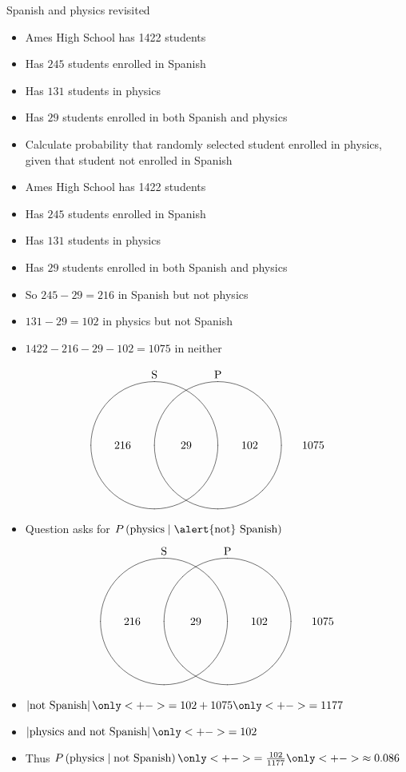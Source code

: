 \documentclass{beamer}
\theoremstyle{definition}
\begin{document}
\begin{frame}{Spanish and physics revisited}
\begin{itemize}
\item Ames High School has 1422 students
\item Has $245$ students enrolled in Spanish
\item Has $131$ students in physics
\item Has $29$ students enrolled in both Spanish and physics
\item Calculate probability that randomly selected student
enrolled in physics, given that student \alert{not} enrolled in Spanish
\end{itemize}
\end{frame}

\begin{frame}
\begin{itemize}
\item Ames High School has 1422 students
\item Has $245$ students enrolled in Spanish
\item Has $131$ students in physics
\item Has $29$ students enrolled in both Spanish and physics
\item So $245-29=216$ in Spanish but not physics
\item $131-29=102$ in physics but not Spanish
\item $1422-216-29-102=1075$ in neither
\end{itemize}
\[\begin{xy}<1cm,0cm>:
(-1,2)*+!D{\text{S}};
(1,2)*+!D{\text{P}};
(-1,0)*\cir<2cm>{};
(1,0)*\cir<2cm>{};
(0,0)*{29};
(-2,0)*{216};
(2,0)*{102};
(4,0)*{1075};
\end{xy}\]
\end{frame}

\begin{frame}
\begin{itemize}
\item Question asks for $P\left(\text{physics}\mid
\text{\alert{not} Spanish}\right)$
\[\begin{xy}<1cm,0cm>:
(-1,2)*+!D{\text{S}};
(1,2)*+!D{\text{P}};
(-1,0)*\cir<2cm>{};
(1,0)*\cir<2cm>{};
(0,0)*{29};
(-2,0)*{216};
(2,0)*{102};
(4,0)*{1075};
\end{xy}\]
\item $\left|\text{not Spanish}\right|
\only<+->{=102+1075}\only<+->{=1177}$
\item $\left|\text{physics and not Spanish}\right|
\only<+->{=102}$
\item Thus
$P\left(\text{physics}\mid
\text{not Spanish}\right)\only<+->{=\frac{102}{1177}}
\only<+->{\approx 0.086}$
\end{itemize}
\end{frame}
\end{document}
